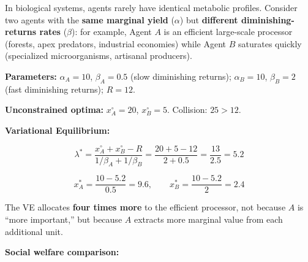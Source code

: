 \documentclass[11pt]{article}
\theoremstyle{plain}
\theoremstyle{definition}
\theoremstyle{remark}
\begin{document}
In biological systems, agents rarely have identical metabolic profiles.
Consider two agents with the \textbf{same marginal yield} (\(\alpha\))
but \textbf{different diminishing-returns rates} (\(\beta\)): for
example, Agent \(A\) is an efficient large-scale processor (forests,
apex predators, industrial economies) while Agent \(B\) saturates
quickly (specialized microorganisms, artisanal producers).

\textbf{Parameters:} \(\alpha_A = 10\), \(\beta_A = 0.5\) (slow
diminishing returns); \(\alpha_B = 10\), \(\beta_B = 2\) (fast
diminishing returns); \(R = 12\).

\textbf{Unconstrained optima:} \(x_A^{\circ} = 20\),
\(x_B^{\circ} = 5\). Collision: \(25 > 12\).

\textbf{Variational Equilibrium:}

\[\lambda^* = \frac{x_A^{\circ} + x_B^{\circ} - R}{1/\beta_A + 1/\beta_B} = \frac{20 + 5 - 12}{2 + 0.5} = \frac{13}{2.5} = 5.2\]

\[x_A^* = \frac{10 - 5.2}{0.5} = 9.6, \qquad x_B^* = \frac{10 - 5.2}{2} = 2.4\]

The VE allocates \textbf{four times more} to the efficient processor,
not because \(A\) is ``more important,'' but because \(A\) extracts more
marginal value from each additional unit.

\textbf{Social welfare comparison:}
\end{document}
